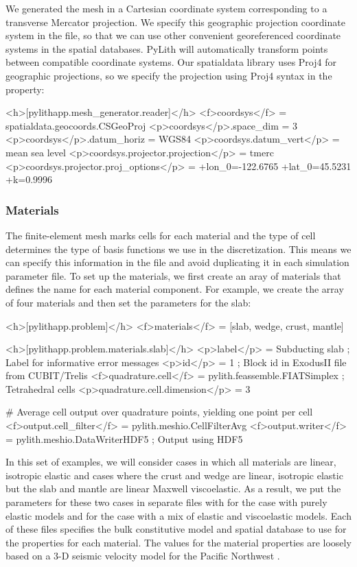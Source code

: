 We generated the mesh in a Cartesian coordinate system corresponding
to a transverse Mercator projection. We specify this geographic
projection coordinate system in the  file, so
that we can use other convenient georeferenced coordinate systems in
the spatial databases. PyLith will automatically transform points
between compatible coordinate systems. Our spatialdata library uses
Proj4 for geographic projections, so we specify the projection using
Proj4 syntax in the  property:
\begin{cfg}
<h>[pylithapp.mesh_generator.reader]</h>
<f>coordsys</f> = spatialdata.geocoords.CSGeoProj
<p>coordsys</p>.space_dim = 3
<p>coordsys</p>.datum_horiz = WGS84
<p>coordsys.datum_vert</p> = mean sea level
<p>coordsys.projector.projection</p> = tmerc
<p>coordsys.projector.proj_options</p> = +lon_0=-122.6765 +lat_0=45.5231 +k=0.9996
\end{cfg}

\subsubsection{Materials}

The finite-element mesh marks cells for each material and the type of
cell determines the type of basis functions we use in the
discretization. This means we can specify this information in the
 file and avoid duplicating it in each
simulation parameter file. To set up the materials, we first create an
aray of materials that defines the name for each material component.
For example, we create the array of four materials and then set the
parameters for the slab:
\begin{cfg}
<h>[pylithapp.problem]</h>
<f>materials</f> = [slab, wedge, crust, mantle]

<h>[pylithapp.problem.materials.slab]</h>
<p>label</p> = Subducting slab ; Label for informative error messages
<p>id</p> = 1 ; Block id in ExodusII file from CUBIT/Trelis
<f>quadrature.cell</f> = pylith.feassemble.FIATSimplex ; Tetrahedral cells
<p>quadrature.cell.dimension</p> = 3

# Average cell output over quadrature points, yielding one point per cell
<f>output.cell_filter</f> = pylith.meshio.CellFilterAvg
<f>output.writer</f> = pylith.meshio.DataWriterHDF5 ; Output using HDF5
\end{cfg}

In this set of examples, we will consider cases in which all materials
are linear, isotropic elastic and cases where the crust and wedge are
linear, isotropic elastic but the slab and mantle are linear Maxwell
viscoelastic. As a result, we put the parameters for these two cases
in separate  files with  for
the case with purely elastic models and
 for the case with a mix of elastic
and viscoelastic models. Each of these files specifies the bulk
constitutive model and spatial database to use for the properties for
each material. The values for the material properties are loosely
based on a 3-D seismic velocity model for the Pacific Northwest 
\cite{Stephenson:2007}.

